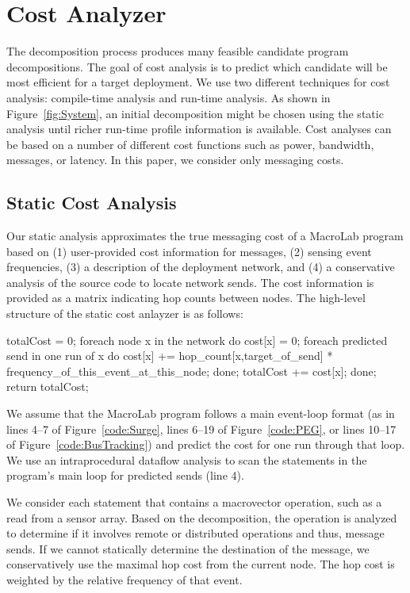 \section{Cost Analyzer} \label{sect:costAnalyzer}

The decomposition process produces many feasible candidate program
decompositions. The goal of cost analysis is to predict which
candidate will be most efficient for a target deployment.  We use two
different techniques for cost analysis: compile-time analysis and
run-time analysis.  As shown in Figure~\ref{fig:System}, an initial
decomposition might be chosen using the static analysis until richer
run-time profile information is available. Cost analyses can be based
on a number of different cost functions such as power, bandwidth,
messages, or latency.  In this paper, we consider only messaging costs.

\subsection{Static Cost Analysis}\label{sect:staticCost}

Our static analysis approximates the true messaging cost of a MacroLab
program based on (1) user-provided cost information for messages, (2) sensing event
frequencies, (3) a description of the deployment network, and (4) a conservative
analysis of the source code to locate network sends. The cost information
is provided as a matrix indicating hop counts between nodes. The high-level
structure of the static cost anlayzer is as follows: 

\begin{macrolab} 
totalCost = 0; 
foreach node x in the network do 
  cost[x] = 0;
  foreach predicted send in one run of x do
    cost[x] += hop_count[x,target_of_send] *
      frequency_of_this_event_at_this_node;
  done;
  totalCost += cost[x];
done;
return totalCost;
\end{macrolab} 

We assume that the MacroLab program follows a main event-loop format (as in
lines 4--7 of Figure~\ref{code:Surge}, lines 6--19 of
Figure~\ref{code:PEG}, or lines 10--17 of Figure~\ref{code:BusTracking})
and predict the cost for one run through that loop. We use an
intraprocedural dataflow analysis to scan the statements in the program's
main loop for predicted sends (line 4). 

We consider each statement that contains a macrovector operation, such  
as a read from a sensor array. Based on the decomposition, the operation is
analyzed to determine if it involves remote or distributed operations and
thus, message sends. If we cannot statically determine the destination of
the message, we conservatively use the maximal hop cost from the current
node. The hop cost is weighted by the relative frequency of that event. 


